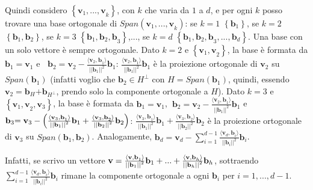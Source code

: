 \documentclass{article}
\begin{document}
Quindi considero $\left\{ \mathbf{v}_{1}\mathbf{,...,v}_{k}\right\} $, con $%
k $ che varia da $1$ a $d$, e per ogni $k$ posso trovare una base ortogonale
di $Span\left( \mathbf{v}_{1}\mathbf{,...,v}_{k}\right) $: se $k=1$ $\left\{ 
\mathbf{b}_{1}\right\} $, se $k=2$ $\left\{ \mathbf{b}_{1},\mathbf{b}%
_{2}\right\} $, se $k=3$ $\left\{ \mathbf{b}_{1},\mathbf{b}_{2}\mathbf{,b}%
_{3}\right\} $,..., se $k=d$ $\left\{ \mathbf{b}_{1},\mathbf{b}_{2}\mathbf{,b%
}_{3},...,\mathbf{b}_{d}\right\} $. Una base con un solo vettore \`{e}
sempre ortogonale. Dato $k=2$ e $\left\{ \mathbf{v}_{1}\mathbf{,v}%
_{2}\right\} $, la base \`{e} formata da $\mathbf{b}_{1}\mathbf{=v}_{1}$ e%
\textbf{\ }$\mathbf{b}_{2}\mathbf{=v}_{2}-\frac{\langle \mathbf{v}_{2}%
\mathbf{,b}_{1}\rangle }{\left\vert \left\vert \mathbf{b}_{1}\right\vert
\right\vert ^{2}}\mathbf{b}_{1}$: $\frac{\langle \mathbf{v}_{2}\mathbf{,b}%
_{1}\rangle }{\left\vert \left\vert \mathbf{b}_{1}\right\vert \right\vert
^{2}}\mathbf{b}_{1}$ \`{e} la proiezione ortogonale di $\mathbf{v}_{2}$ su $%
Span\left( \mathbf{b}_{1}\right) $ (infatti voglio che $\mathbf{b}_{2}\in
H^{\perp }$ con $H=Span\left( \mathbf{b}_{1}\right) $, quindi, essendo $%
\mathbf{v}_{2}\mathbf{=b}_{H}\mathbf{+b}_{H^{\perp }}$, prendo solo la
componente ortogonale a $H$). Dato $k=3$ e $\left\{ \mathbf{v}_{1}\mathbf{,v}%
_{2},\mathbf{v}_{3}\right\} $, la base \`{e} formata da $\mathbf{b}_{1}%
\mathbf{=v}_{1}$,\textbf{\ }$\mathbf{b}_{2}\mathbf{=v}_{2}-\frac{\langle 
\mathbf{v}_{2}\mathbf{,b}_{1}\rangle }{\left\vert \left\vert \mathbf{b}%
_{1}\right\vert \right\vert ^{2}}\mathbf{b}_{1}$ e $\mathbf{b}_{3}\mathbf{=v}%
_{3}-\left( \frac{\langle \mathbf{v}_{3}\mathbf{,b}_{1}\rangle }{\left\vert
\left\vert \mathbf{b}_{1}\right\vert \right\vert ^{2}}\mathbf{b}_{1}+\frac{%
\langle \mathbf{v}_{3}\mathbf{,b}_{2}\rangle }{\left\vert \left\vert \mathbf{%
b}_{2}\right\vert \right\vert ^{2}}\mathbf{b}_{2}\right) $: $\frac{\langle 
\mathbf{v}_{3}\mathbf{,b}_{1}\rangle }{\left\vert \left\vert \mathbf{b}%
_{1}\right\vert \right\vert ^{2}}\mathbf{b}_{1}+\frac{\langle \mathbf{v}_{3}%
\mathbf{,b}_{2}\rangle }{\left\vert \left\vert \mathbf{b}_{2}\right\vert
\right\vert ^{2}}\mathbf{b}_{2}$ \`{e} la proiezione ortogonale di $\mathbf{v%
}_{3}$ su $Span\left( \mathbf{b}_{1},\mathbf{b}_{2}\right) $. Analogamente, $%
\mathbf{b}_{d}=\mathbf{v}_{d}-\sum_{i=1}^{d-1}\frac{\langle \mathbf{v}_{d}%
\mathbf{,b}_{i}\rangle }{\left\vert \left\vert \mathbf{b}_{i}\right\vert
\right\vert ^{2}}\mathbf{b}_{i}$.

Infatti, se scrivo un vettore $\mathbf{v}=\frac{\langle \mathbf{v,b}_{1}%
\mathbf{\rangle }}{\left\vert \left\vert \mathbf{b}_{1}\right\vert
\right\vert ^{2}}\mathbf{b}_{1}+...+\frac{\langle \mathbf{v,b}_{h}\mathbf{%
\rangle }}{\left\vert \left\vert \mathbf{b}_{h}\right\vert \right\vert ^{2}}%
\mathbf{b}_{h}$, sottraendo $\sum_{i=1}^{d-1}\frac{\langle \mathbf{v}_{d}%
\mathbf{,b}_{i}\rangle }{\left\vert \left\vert \mathbf{b}_{i}\right\vert
\right\vert ^{2}}\mathbf{b}_{i}$ rimane la componente ortogonale a ogni $%
\mathbf{b}_{i}$ per $i=1,...,d-1$.
\end{document}
